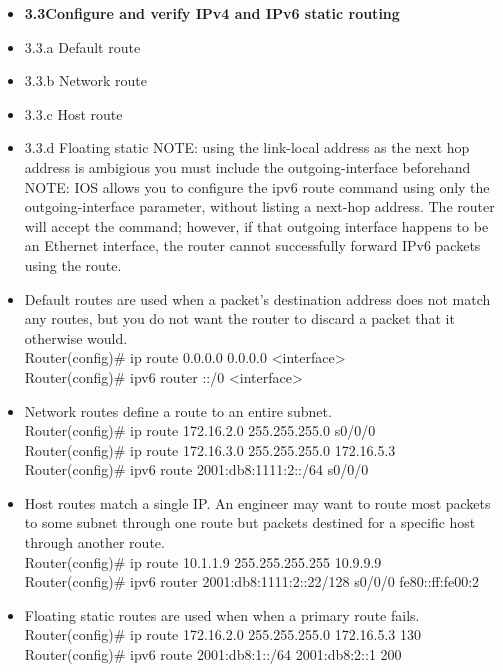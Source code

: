 \documentclass{article}
\begin{document}
\begin{itemize}
  \item \textbf{3.3Configure and verify IPv4 and IPv6 static routing}
  \item 3.3.a Default route
  \item 3.3.b Network route
  \item 3.3.c Host route
  \item 3.3.d Floating static
  	NOTE: using the link-local address as the next hop address is ambigious you must include the outgoing-interface beforehand\\
  	NOTE: IOS allows you to configure the ipv6 route command using only the outgoing-interface parameter, without listing a next-hop address. The router will accept the command; however, if that outgoing interface happens to be an Ethernet interface, the router cannot successfully forward IPv6 packets using the route.
  	\item[] Default routes are used when a packet's destination address does not match any routes, but you do not want the router to discard a packet that it otherwise would.\\
  		Router(config)\# ip route 0.0.0.0 0.0.0.0 \textless interface\textgreater\\
  		Router(config)\# ipv6 router ::/0 \textless interface\textgreater
  	\item[] Network routes define a route to an entire subnet.\\
  		Router(config)\# ip route 172.16.2.0 255.255.255.0 s0/0/0\\
  		Router(config)\# ip route 172.16.3.0 255.255.255.0 172.16.5.3\\
  		Router(config)\# ipv6 route 2001:db8:1111:2::/64 s0/0/0
  	\item[] Host routes match a single IP. An engineer may want to route most packets to some subnet through one route but packets destined for a specific host through another route.\\
  		Router(config)\# ip route 10.1.1.9 255.255.255.255 10.9.9.9\\
  		Router(config)\# ipv6 router 2001:db8:1111:2::22/128 s0/0/0 fe80::ff:fe00:2
  	\item[] Floating static routes are used when when a primary route fails.\\
  		Router(config)\# ip route 172.16.2.0 255.255.255.0 172.16.5.3 130\\
  		Router(config)\# ipv6 route 2001:db8:1::/64 2001:db8:2::1 200
  		

\end{itemize}
\end{document}
